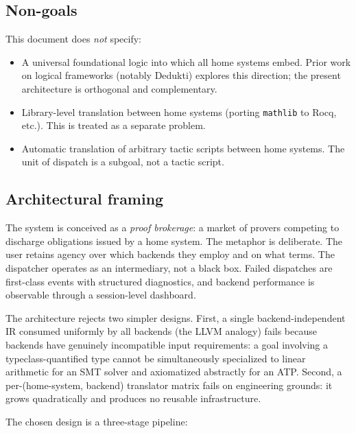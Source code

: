 \documentclass[11pt,letterpaper]{article}
\theoremstyle{definition}
\theoremstyle{remark}
\begin{document}
\subsection{Non-goals}

This document does \emph{not} specify:

\begin{itemize}[leftmargin=2em]
  \item A universal foundational logic into which all home systems embed.
        Prior work on logical frameworks (notably Dedukti) explores this
        direction; the present architecture is orthogonal and complementary.
  \item Library-level translation between home systems (porting
        \texttt{mathlib} to Rocq, etc.). This is treated as a separate problem.
  \item Automatic translation of arbitrary tactic scripts between home
        systems. The unit of dispatch is a subgoal, not a tactic script.
\end{itemize}

\subsection{Architectural framing}

The system is conceived as a \emph{proof brokerage}: a market of provers
competing to discharge obligations issued by a home system. The metaphor is
deliberate. The user retains agency over which backends they employ and on
what terms. The dispatcher operates as an intermediary, not a black box.
Failed dispatches are first-class events with structured diagnostics, and
backend performance is observable through a session-level dashboard.

The architecture rejects two simpler designs. First, a single
backend-independent IR consumed uniformly by all backends (the LLVM analogy)
fails because backends have genuinely incompatible input requirements: a
goal involving a typeclass-quantified type cannot be simultaneously
specialized to linear arithmetic for an SMT solver and axiomatized
abstractly for an ATP. Second, a per-(home-system, backend) translator
matrix fails on engineering grounds: it grows quadratically and produces no
reusable infrastructure.

The chosen design is a three-stage pipeline:
\end{document}
